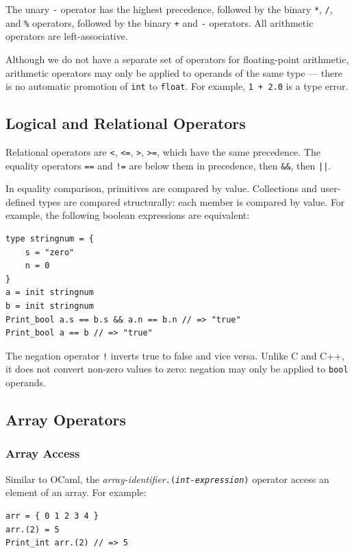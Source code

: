 \documentclass[11pt, onecolumn, letterpaper]{article}
\begin{document}
The unary \texttt{-} operator has the highest precedence, followed by the binary \texttt{*}, \texttt{/}, and \texttt{\%} operators, followed by the binary \texttt{+} and \texttt{-} operators. All arithmetic operators are left-associative. 

Although we do not have a separate set of operators for floating-point arithmetic, arithmetic operators may only be applied to operands of the same type --- there is no automatic promotion of \texttt{int} to \texttt{float}. For example, \texttt{1 + 2.0} is a type error.

\subsection{Logical and Relational Operators}

Relational operators are \texttt{<}, \texttt{<=}, \texttt{>}, \texttt{>=}, which have the same precedence. The equality operators \texttt{==} and \texttt{!=} are below them in precedence, then \texttt{\&\&}, then \texttt{||}.

In equality comparison, primitives are compared by value. Collections and user-defined types are compared structurally: each member is compared by value. For example, the following boolean expressions are equivalent:

\begin{lstlisting}
type stringnum = {
    s = "zero"
    n = 0
}
a = init stringnum
b = init stringnum
Print_bool a.s == b.s && a.n == b.n // => "true"
Print_bool a == b // => "true"
\end{lstlisting}

The negation operator \texttt{!} inverts true to false and vice versa. Unlike C and C++, it does not convert non-zero values to zero: negation may only be applied to \texttt{bool} operands.

\subsection{Array Operators}
\subsubsection{Array Access}
Similar to OCaml, the \textit{array-identifier}\texttt{.(\textrm{\textit{int-expression}})} operator access an element of an array. For example:

\begin{lstlisting}
arr = { 0 1 2 3 4 }
arr.(2) = 5
Print_int arr.(2) // => 5
\end{lstlisting}
\end{document}
